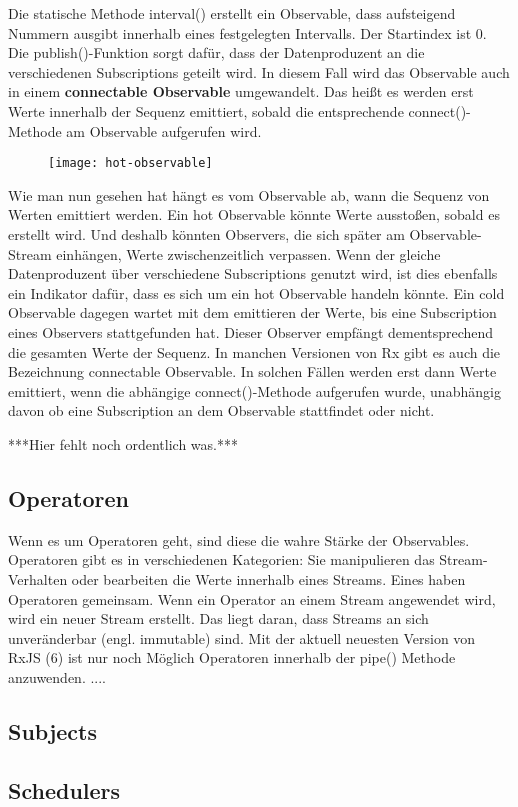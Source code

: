 \noindent
Die statische Methode interval() erstellt ein Observable, dass aufsteigend Nummern ausgibt innerhalb eines festgelegten Intervalls. Der Startindex ist 0. Die publish()-Funktion sorgt dafür, dass der Datenproduzent an die verschiedenen Subscriptions geteilt wird. In diesem Fall wird das Observable auch in einem \textbf{connectable Observable} umgewandelt. Das heißt es werden erst Werte innerhalb der Sequenz emittiert, sobald die entsprechende connect()-Methode am Observable aufgerufen wird.\\

\begin{figure}[H]
\begin{center}
\texttt{[image: hot-observable]}
\end{center}
\end{figure}



\noindent
Wie man nun gesehen hat hängt es vom Observable ab, wann die Sequenz von Werten emittiert werden. Ein hot Observable könnte Werte ausstoßen, sobald es erstellt wird. Und deshalb könnten Observers, die sich später am Observable-Stream einhängen, Werte zwischenzeitlich verpassen. Wenn der gleiche Datenproduzent über verschiedene Subscriptions genutzt wird, ist dies ebenfalls ein Indikator dafür, dass es sich um ein hot Observable handeln könnte. Ein cold Observable dagegen wartet mit dem emittieren der Werte, bis eine Subscription eines Observers stattgefunden hat. Dieser Observer empfängt dementsprechend die gesamten Werte der Sequenz. In manchen Versionen von Rx gibt es auch die Bezeichnung connectable Observable. In solchen Fällen werden erst dann Werte emittiert, wenn die abhängige connect()-Methode aufgerufen wurde, unabhängig davon ob eine Subscription an dem Observable stattfindet oder nicht.\cite{hot-vs-cold-part-2}

\noindent
\begin{center}
***Hier fehlt noch ordentlich was.*** 
\end{center}


\subsection{Operatoren}
Wenn es um Operatoren geht, sind diese die wahre Stärke der Observables. Operatoren gibt es in verschiedenen Kategorien: Sie manipulieren das Stream-Verhalten oder bearbeiten die Werte innerhalb eines Streams. Eines haben Operatoren gemeinsam. Wenn ein Operator an einem Stream angewendet wird, wird ein neuer Stream erstellt. Das liegt daran, dass Streams an sich unveränderbar (engl. immutable) sind.
Mit der aktuell neuesten Version von RxJS (6) ist nur noch Möglich Operatoren innerhalb der pipe() Methode anzuwenden.  ....


\subsection{Subjects}
\subsection{Schedulers}









